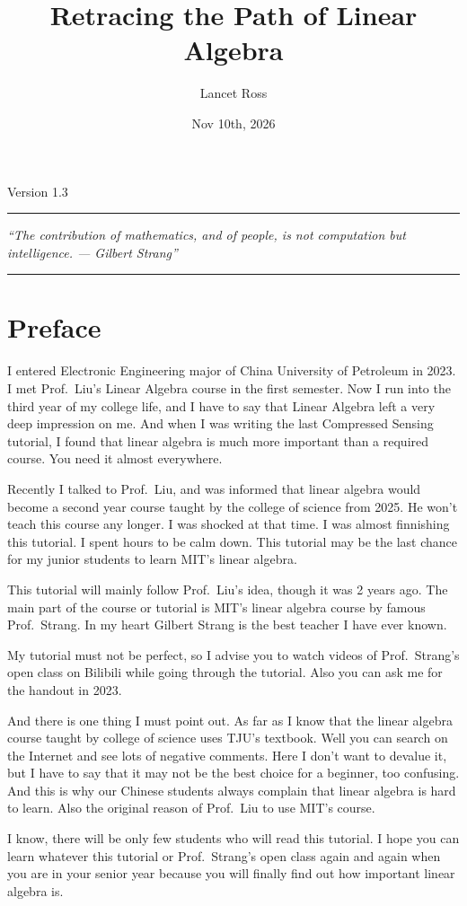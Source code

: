 \documentclass[10pt,a4paper,oneside,numbers=noenddot]{scrbook}
\title{Retracing the Path of Linear Algebra}
\author{Lancet Ross}
\date{Nov 10th, 2026}
\makeatletter
\newcommand*{\bookversion}{1.3}
\newcommand*{\bookquote}{``The contribution of mathematics, and of people, is not computation but intelligence. --- Gilbert Strang''}
\theoremstyle{ctplain}
\theoremstyle{ctresult}
\renewcommand*{\maketitle}{%
  \begin{titlepage}
    \hypersetup{pageanchor=false}
    \centering
    \null\vspace{5em}
    {\Huge\bfseries \@title\par}
    \vspace{1.5em}
    {\large Version \bookversion\par}
    \vspace{3em}
    \rule{\textwidth}{0.4pt}\par
    \vspace{1.2em}
    {\itshape \bookquote\par}
    \vspace{1.2em}
    \rule{\textwidth}{0.4pt}\par
    \vfill
    {\large \@author\par}
    \vspace{0.6em}
    {\large \@date\par}
    \vspace{2em}
  \end{titlepage}
}
\makeatother
\begin{document}
\maketitle

\frontmatter
\tableofcontents

\chapter*{Preface}
\linespread{1.55}\selectfont

I entered Electronic Engineering major of China University of Petroleum in 2023. I met
Prof.\ Liu's Linear Algebra course in the first semester. Now I run into the third year of my
college life, and I have to say that Linear Algebra left a very deep impression on me. And
when I was writing the last Compressed Sensing tutorial, I found that linear algebra is
much more important than a required course. You need it almost everywhere.

Recently I talked to Prof.\ Liu, and was informed that linear algebra would become a second
year course taught by the college of science from 2025. He won't teach this course any longer.
I was shocked at that time. I was almost finnishing this tutorial. I spent hours to be calm
down. This tutorial may be the last chance for my junior students to learn MIT's linear algebra.

This tutorial will mainly follow Prof.\ Liu's idea, though it was 2 years ago. The main part
of the course or tutorial is MIT's linear algebra course by famous Prof.\ Strang. In my heart
Gilbert Strang is the best teacher I have ever known. 

My tutorial must not be perfect, so I advise you to watch videos of Prof.\ Strang's open
class on Bilibili while going through the tutorial. Also you can ask me for the handout
in 2023.

And there is one thing I must point out. As far as I know that the linear algebra course
taught by college of science uses TJU's textbook. Well you can search on the Internet and
see lots of negative comments. Here I don't want to devalue it, but I have to say that it
may not be the best choice for a beginner, too confusing. And this is why our Chinese
students always complain that linear algebra is hard to learn. Also the original reason
of Prof.\ Liu to use MIT's course.

I know, there will be only few students who will read this tutorial. I hope you can learn
whatever this tutorial or Prof.\ Strang's open class again and again when you are in your
senior year because you will finally find out how important linear algebra is.
\end{document}
